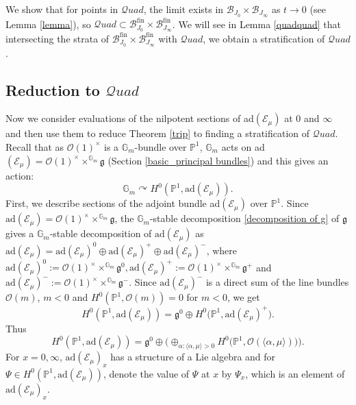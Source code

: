 \documentclass{amsart}
\newcommand{\cE}{\mathcal{E}}
\newcommand{\cQuad}{\mathcal{Q}uad}
\newcommand{\gm}{\mathbb{G}_{m}}
\theoremstyle{plain}
\theoremstyle{definition}
\theoremstyle{remark}
\DeclareMathOperator{\fin}{fin}
\begin{document}
We show that for points in $\cQuad$, the limit exists in $\mathcal{B}_{J_{0}}\times\mathcal{B}_{J_{\infty}}$ as $t\to 0$
(see Lemma \ref{lemma}), so $\cQuad\subset\mathcal{B}_{J_{0}}^{\fin}\times\mathcal{B}_{J_{\infty}}^{\fin}$.
We will see in Lemma \ref{quadquad} that intersecting the strata of $\mathcal{B}_{J_{0}}^{\fin}\times\mathcal{B}_{J_{\infty}}^{\fin}$ with $\cQuad$, we obtain a
stratification of $\cQuad$.
\subsection{Reduction to $\cQuad$}
Now we consider %
evaluations of the nilpotent sections of ad$(\cE_{\mu})$ at $0$ and $\infty$ and then use them to reduce Theorem \ref{trip} to finding a stratification of $\cQuad$.
Recall that as $\mathcal{O}(1)^{\times}$ is a $\mathbb{G}_{m}$-bundle over $\mathbb{P}^1$, $\mathbb{G}_{m}$ acts on ad$(\cE_{\mu})=\mathcal{O}(1)^{\times}\times^{\mathbb{G}_{m}}\mathfrak{g}$ (Section \ref{basic_principal bundles}) and this gives an action:
\begin{equation}\label{action on sections}
    \gm\curvearrowright H^{0}(\mathbb{P}^{1},\text{ad}(\cE_{\mu})).
\end{equation}
First, we describe sections of the adjoint bundle ad$(\cE_{\mu})$ over $\mathbb{P}^1$. Since $\text{ad}(\cE_{\mu})=\mathcal{O}(1)^{\times}\times^{\gm}\mathfrak{g}$, the $\mathbb{G}_{m}$-stable decomposition \eqref{decomposition of g} of $\mathfrak{g}$ gives a $\mathbb{G}_{m}$-stable decomposition of $\text{ad}(\cE_{\mu})$ as 
$\text{ad}(\cE_{\mu})=\text{ad}(\cE_{\mu})^{0}\oplus\text{ad}(\cE_{\mu})^{+}\oplus\text{ad}(\cE_{\mu})^{-}$, 
where 
$\text{ad}(\cE_{\mu})^{0}:=\mathcal{O}(1)^{\times}\times^{\mathbb{G}_{m}}\mathfrak{g}^{0}, \text{ad}(\cE_{\mu})^{+}:=\mathcal{O}(1)^{\times}\times^{\mathbb{G}_{m}}\mathfrak{g}^{+}$ and $\text{ad}(\cE_{\mu})^{-}:=\mathcal{O}(1)^{\times}\times^{\mathbb{G}_{m}}\mathfrak{g}^{-}$.
Since $\text{ad}(\cE_{\mu})^{-}$ is a direct sum of the line bundles $\mathcal{O}(m)$, $m<0$ and $H^{0}(\mathbb{P}^{1},\mathcal{O}(m))=0$ for $m<0$, we get
\[
H^{0}(\mathbb{P}^{1},\text{ad}(\cE_{\mu}))=
\mathfrak{g}^{0}\oplus H^{0}\big(\mathbb{P}^{1},\text{ad}(\cE_{\mu})^{+}\big).
\]
Thus
\begin{equation}\label{global sections}
H^{0}(\mathbb{P}^{1},\text{ad}(\cE_{\mu}))
=
\mathfrak{g}^{0}\oplus \Big(\oplus_{\alpha:\langle\alpha,\mu\rangle>0}H^{0}\big(\mathbb{P}^{1},\mathcal{O}(\langle\alpha,\mu\rangle)\big)\Big).
\end{equation}
For $x=0,\infty$, $\text{ad}(\cE_{\mu})_{x}$ has a structure of a Lie algebra and for $\Psi\in H^{0}(\mathbb{P}^{1},\text{ad}(\cE_{\mu}))$, denote the value of $\Psi$ at $x$ by $\Psi_x$, which is an element of $\text{ad}(\cE_{\mu})_{x}$.
\end{document}
